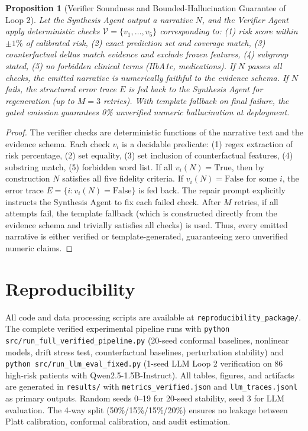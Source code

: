 \documentclass[11pt,a4paper]{article}
\theoremstyle{plain}
\newtheorem{proposition}{Proposition}
\begin{document}
\begin{proposition}[Verifier Soundness and Bounded-Hallucination Guarantee of Loop 2]
\label{prop:loop2_soundness}
Let the Synthesis Agent output a narrative $N$, and the Verifier Agent apply deterministic checks $\mathcal{V} = \{v_1,\dots,v_5\}$ corresponding to: (1) risk score within $\pm 1\%$ of calibrated risk, (2) exact prediction set and coverage match, (3) counterfactual deltas match evidence and exclude frozen features, (4) subgroup stated, (5) no forbidden clinical terms (HbA1c, medications). If $N$ passes all checks, the emitted narrative is numerically faithful to the evidence schema. If $N$ fails, the structured error trace $E$ is fed back to the Synthesis Agent for regeneration (up to $M=3$ retries). With template fallback on final failure, the gated emission guarantees 0\% unverified numeric hallucination at deployment.
\end{proposition}

\begin{proof}
The verifier checks are deterministic functions of the narrative text and the evidence schema. Each check $v_i$ is a decidable predicate: (1) regex extraction of risk percentage, (2) set equality, (3) set inclusion of counterfactual features, (4) substring match, (5) forbidden word list. If all $v_i(N) = \text{True}$, then by construction $N$ satisfies all five fidelity criteria. If $v_i(N) = \text{False}$ for some $i$, the error trace $E = \{i : v_i(N) = \text{False}\}$ is fed back. The repair prompt explicitly instructs the Synthesis Agent to fix each failed check. After $M$ retries, if all attempts fail, the template fallback (which is constructed directly from the evidence schema and trivially satisfies all checks) is used. Thus, every emitted narrative is either verified or template-generated, guaranteeing zero unverified numeric claims.
\end{proof}

\section*{Reproducibility}

All code and data processing scripts are available at \texttt{reproducibility\_package/}. The complete verified experimental pipeline runs with \texttt{python src/run\_full\_verified\_pipeline.py} (20-seed conformal baselines, nonlinear models, drift stress test, counterfactual baselines, perturbation stability) and \texttt{python src/run\_llm\_eval\_fixed.py} (1-seed LLM Loop 2 verification on 86 high-risk patients with Qwen2.5-1.5B-Instruct). All tables, figures, and artifacts are generated in \texttt{results/} with \texttt{metrics\_verified.json} and \texttt{llm\_traces.jsonl} as primary outputs. Random seeds 0--19 for 20-seed stability, seed 3 for LLM evaluation. The 4-way split (50\%/15\%/15\%/20\%) ensures no leakage between Platt calibration, conformal calibration, and audit estimation.
\end{document}
